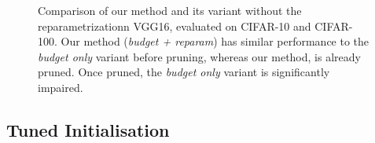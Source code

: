 \begin{figure}
  \centering
  \caption{Comparison of our method and its variant without the
    reparametrizationn VGG16, evaluated on CIFAR-10 and CIFAR-100. Our method
    (\emph{budget + reparam}) has similar performance to the \emph{budget only}
    variant before pruning, whereas our method, is already pruned. Once pruned,
    the \emph{budget only} variant is significantly impaired.}
  \label{fig:chap1:budget_only_vgg16}
\end{figure}



\subsection{Tuned Initialisation}
\label{sec:chap1:impact_of_fine_tuning}


